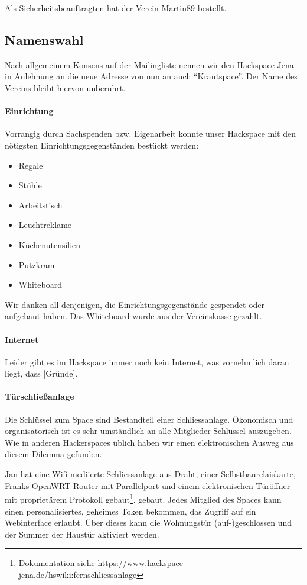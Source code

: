 \documentclass[10pt,DIV16]{scrartcl}
\begin{document}
Als Sicherheitsbeauftragten hat der Verein Martin89 bestellt.

\subsection{Namenswahl}

Nach allgemeinem Konsens auf der Mailingliste nennen wir den Hackspace Jena in
Anlehnung an die neue Adresse von nun an auch "`Krautspace"'.  Der Name des
Vereins bleibt hiervon unberührt.

\paragraph{Einrichtung}

Vorrangig durch Sachspenden bzw. Eigenarbeit konnte unser Hackspace mit den
nötigsten Einrichtungsgegenständen bestückt werden:
\begin{itemize}
	\item Regale
	\item Stühle
	\item Arbeitstisch
	\item Leuchtreklame
	\item Küchenutensilien
	\item Putzkram
	\item Whiteboard
\end{itemize}
Wir danken all denjenigen, die Einrichtungsgegenstände gespendet oder
aufgebaut haben.  Das Whiteboard wurde aus der Vereinskasse gezahlt.

\paragraph{Internet}

Leider gibt es im Hackspace immer noch kein Internet, was vornehmlich daran
liegt, dass [Gründe].

\paragraph{Türschließanlage}

Die Schl\"ussel zum Space sind Bestandteil einer
Schliessanlage. \"Okonomisch und organisatorisch ist es sehr
umst\"andlich an alle Mitglieder Schl\"ussel auszugeben. Wie in
anderen Hackerspaces \"ublich haben wir einen elektronischen Ausweg
aus diesem Dilemma gefunden.

Jan hat eine Wifi-mediierte Schliessanlage aus Draht, einer
Selbstbaurelaiskarte, Franks OpenWRT-Router mit Parallelport und einem
elektronischen T\"ur\"offner mit propriet\"arem Protokoll
gebaut\footnote{Dokumentation siehe
  https://www.hackspace-jena.de/hswiki:fernschliessanlage}.
gebaut. Jedes Mitglied des Spaces kann einen personalisiertes,
geheimes Token bekommen, das Zugriff auf ein Webinterface
erlaubt. \"Uber dieses kann die Wohnungst\"ur (auf-)geschlossen und der
Summer der Haust\"ur aktiviert werden.
\end{document}
